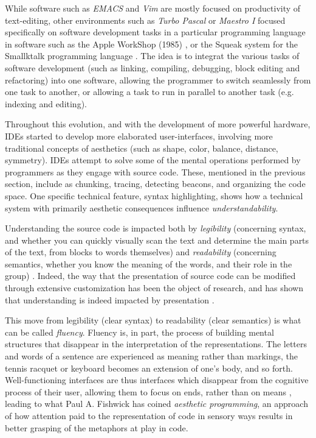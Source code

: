 While software such as \emph{EMACS} and \emph{Vim} are mostly focused on productivity of text-editing, other environments such as \emph{Turbo Pascal} or \emph{Maestro I} focused specifically on software development tasks in a particular programming language in software such as the Apple WorkShop (1985) \citep{west_macintosh_1987}, or the Squeak system for the Smallktalk programming language \citep{ingalls_back_1997}. The idea is to integrat the various tasks of software development (such as linking, compiling, debugging, block editing and refactoring) into one software, allowing the programmer to switch seamlessly from one task to another, or allowing a task to run in parallel to another task (e.g. indexing and editing).

Throughout this evolution, and with the development of more powerful hardware, IDEs started to develop more elaborated user-interfaces, involving more traditional concepts of aesthetics (such as shape, color, balance, distance, symmetry). IDEs attempt to solve some of the mental operations performed by programmers as they engage with source code. These, mentioned in the previous section, include as chunking, tracing, detecting beacons, and organizing the code space. One specific technical feature, syntax highlighting, shows how a technical system with primarily aesthetic consequences influence \emph{understandability}.

Understanding the source code is impacted both by \emph{legibility} (concerning syntax, and whether you can quickly visually scan the text and determine the main parts of the text, from blocks to words themselves) and \emph{readability} (concerning semantics, whether you know the meaning of the words, and their role in the group) \citep{oliveira_evaluating_2020}. Indeed, the way that the presentation of source code can be modified through extensive customization has been the object of research, and has shown that understanding is indeed impacted by presentation \citep{jacques_understanding_2015}.

This move from legibility (clear syntax) to readability (clear semantics) is what can be called \emph{fluency}. Fluency is, in part, the process of building mental structures that disappear in the interpretation of the representations. The letters and words of a sentence are experienced as meaning rather than markings, the tennis racquet or keyboard becomes an extension of one's body, and so forth. Well-functioning interfaces are thus interfaces which disappear from the cognitive process of their user, allowing them to focus on ends, rather than on means \citep{galloway_interface_2012}, leading to what Paul A. Fishwick has coined \emph{aesthetic programming}, an approach of how attention paid to the representation of code in sensory ways results in better grasping of the metaphors at play in code.

